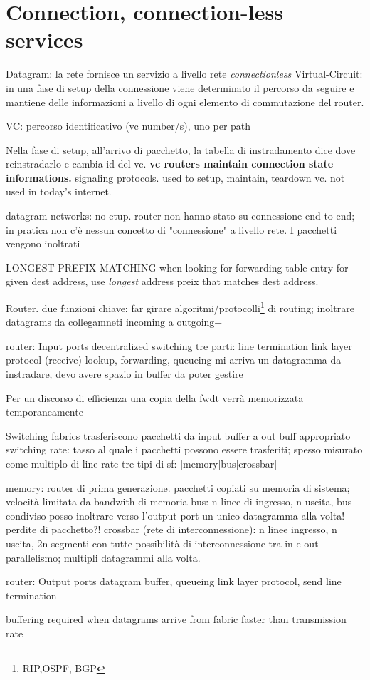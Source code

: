 \section{Connection, connection-less services}
Datagram: la rete fornisce un servizio a livello rete \textit{connectionless}
Virtual-Circuit: in una fase di setup della connessione viene determinato il percorso da seguire e mantiene delle informazioni a livello di ogni elemento di commutazione del router.

VC:
	percorso
	identificativo (vc number/s), uno per path

Nella fase di setup, all'arrivo di pacchetto, la tabella di instradamento dice dove reinstradarlo e cambia id del vc. 
\textbf{vc routers maintain connection state informations.}
signaling protocols.
used to setup, maintain, teardown vc. not used in today's internet.

datagram networks:
	no etup.
	router non hanno stato su connessione end-to-end; in pratica non c'è nessun concetto di "connessione" a livello rete. I pacchetti vengono inoltrati %


LONGEST PREFIX MATCHING
when looking for forwarding table entry for given dest address, use \textit{longest} address preix that matches dest address.


Router.
due funzioni chiave:
	far girare algoritmi/protocolli\footnote{RIP,OSPF, BGP} di routing;
	inoltrare datagrams da collegamneti incoming a outgoing+

	router: Input ports
		decentralized switching
		tre parti: 	
					line termination
					link layer protocol (receive)
					lookup, forwarding, queueing	mi arriva un datagramma da instradare, devo avere spazio
													in buffer da poter gestire
		
		Per un discorso di efficienza una copia della fwdt verrà memorizzata temporaneamente

		Switching fabrics
		trasferiscono pacchetti da input buffer a out buff appropriato
		switching rate: tasso al quale i pacchetti possono essere trasferiti; spesso misurato come multiplo di line rate
		tre tipi di sf:
			|memory|bus|crossbar|
			
			memory:
				router di prima generazione. pacchetti copiati su memoria di sistema; velocità limitata da bandwith di memoria
			bus:
				n linee di ingresso, n uscita, bus condiviso
				posso inoltrare verso l'output port un unico datagramma  alla volta!
				perdite di pacchetto?!
			crossbar (rete di interconnessione):
				n linee ingresso, n uscita, 2n segmenti con tutte possibilità di interconnessione tra in e out
				parallelismo; multipli datagrammi alla volta.
				
	router: Output ports
		datagram buffer, queueing
		link layer protocol, send
		line termination
		
		buffering required when datagrams arrive from fabric faster than transmission rate